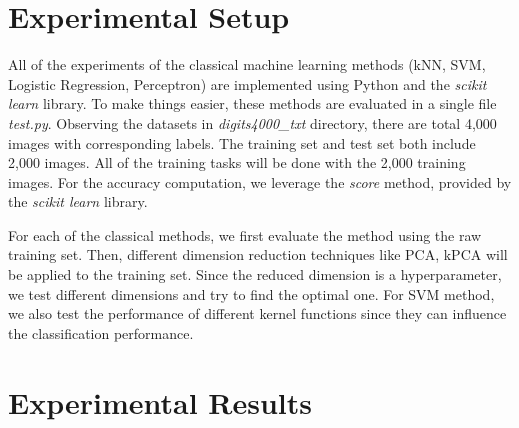 \documentclass[12pt]{article}
\begin{document}
\section{\fontsize{12}{12}\selectfont Experimental Setup}
All of the experiments of the classical machine learning methods (kNN, SVM, Logistic Regression, Perceptron) are implemented using Python and the \emph{scikit learn} library. To make things easier, these methods are evaluated in a single file \emph{test.py}. Observing the datasets in \emph{digits4000\_txt} directory, there are total 4,000 images with corresponding labels. The training set and test set both include 2,000 images. All of the training tasks will be done with the 2,000 training images. For the accuracy computation, we leverage the \emph{score} method, provided by the \emph{scikit learn} library.

For each of the classical methods, we first evaluate the method using the raw training set. Then, different dimension reduction techniques like PCA, kPCA will be applied to the training set. Since the reduced dimension is a hyperparameter, we test different dimensions and try to find the optimal one. For SVM method, we also test the performance of different kernel functions since they can influence the classification performance.

\section{\fontsize{12}{12}\selectfont Experimental Results}
\end{document}
